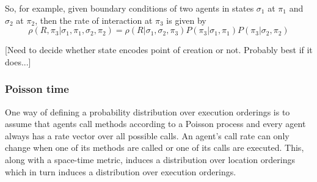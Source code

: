 \documentclass[a4paper]{article}
\begin{document}
So, for example, given boundary conditions of two agents in states $\sigma_1$ at $\pi_1$ and $\sigma_2$ at $\pi_2$, then the rate of interaction at $\pi_3$ is given by
\[
\rho(R, \pi_3 | \sigma_1, \pi_1, \sigma_2, \pi_2) = \rho(R | \sigma_1, \sigma_2, \pi_3)P(\pi_3 | \sigma_1, \pi_1)P(\pi_3 | \sigma_2, \pi_2)
\]

[Need to decide whether state encodes point of creation or not. Probably best if it does...]

\subsubsection{Poisson time}

One way of defining a probability distribution over execution orderings is to assume that agents call methods according to a Poisson process and every agent always has a rate vector over all possible calls. An agent's call rate can only change when one of its methods are called or one of its calls are executed. This, along with a space-time metric, induces a distribution over location orderings which in turn induces a distribution over execution orderings.
\end{document}
